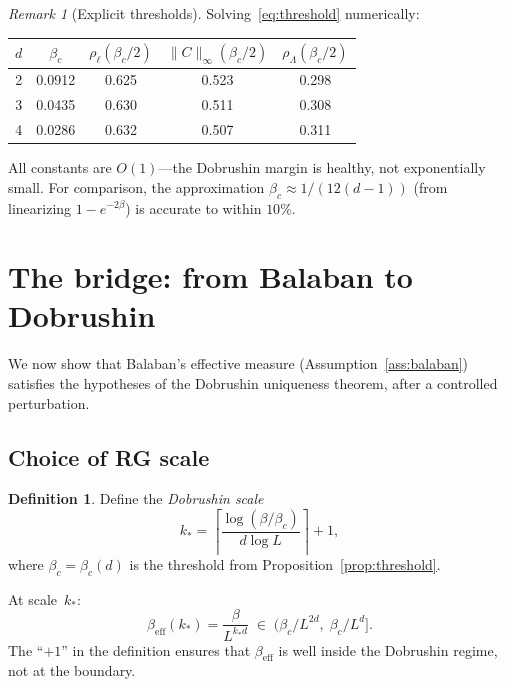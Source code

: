 \documentclass[11pt]{article}
\theoremstyle{definition}
\newtheorem{definition}[theorem]{Definition}
\theoremstyle{remark}
\newtheorem{remark}[theorem]{Remark}
\begin{document}
\begin{remark}[Explicit thresholds]
Solving~\eqref{eq:threshold} numerically:
\begin{center}
\begin{tabular}{c|cccc}
$d$ & $\beta_c$ & $\rho_\ell(\beta_c/2)$ & $\|C\|_\infty(\beta_c/2)$ & 
$\rho_\Lambda(\beta_c/2)$ \\ \hline
2 & 0.0912 & 0.625 & 0.523 & 0.298 \\
3 & 0.0435 & 0.630 & 0.511 & 0.308 \\
4 & 0.0286 & 0.632 & 0.507 & 0.311
\end{tabular}
\end{center}
All constants are $O(1)$---the Dobrushin margin is healthy, 
not exponentially small.  For comparison, the approximation 
$\beta_c \approx 1/(12(d-1))$ (from linearizing $1-e^{-2\beta}$) 
is accurate to within $10\%$.
\end{remark}

\section{The bridge: from Balaban to Dobrushin}\label{sec:bridge}

We now show that Balaban's effective measure 
(Assumption~\ref{ass:balaban}) satisfies the hypotheses of the 
Dobrushin uniqueness theorem, after a controlled perturbation.

\subsection{Choice of RG scale}

\begin{definition}\label{def:kstar}
Define the \emph{Dobrushin scale}
\[
  k_* = \left\lceil \frac{\log(\beta/\beta_c)}{d\log L} 
  \right\rceil + 1,
\]
where $\beta_c = \beta_c(d)$ is the threshold from 
Proposition~\ref{prop:threshold}.
\end{definition}

At scale~$k_*$:
\begin{equation}\label{eq:beta_eff_kstar}
  \beta_{\mathrm{eff}}(k_*) = \frac{\beta}{L^{k_* d}} 
  \;\in\; \bigl(\beta_c / L^{2d},\; \beta_c / L^d\bigr].
\end{equation}
The ``$+1$'' in the definition ensures that 
$\beta_{\mathrm{eff}}$ is well inside the Dobrushin regime, 
not at the boundary.
\end{document}
